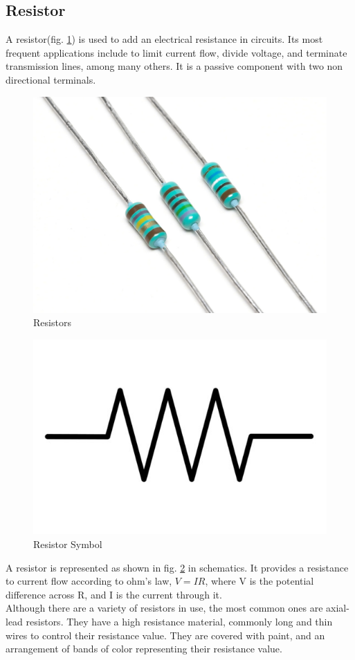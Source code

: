\documentclass{article}
\begin{document}
\subsection{Resistor}
A resistor(fig. \ref{fig:resistors}) is used to add an electrical resistance in circuits. Its most frequent applications include to limit current flow, divide voltage, and terminate transmission lines, among many others. It is a passive component with two non directional terminals. \\
\begin{figure}[h]
	\centering
	\includegraphics[width=0.5\linewidth]{3_Resistors}
	\caption[Resistors]{Resistors}
	\label{fig:resistors}
\end{figure}
\begin{figure}[h]
	\centering
	\includegraphics[width=0.1\linewidth]{resistor_symbol}
	\caption[Resistor Symbol]{Resistor Symbol}
	\label{fig:resistor_symbol}
\end{figure}
A resistor is represented as shown in fig. \ref{fig:resistor_symbol} in schematics. It provides a resistance to current flow according to ohm's law, $ V = IR $, where V is the potential difference across R, and I is the current through it. \\
Although there are a variety of resistors in use, the most common ones are axial-lead resistors. They have a high resistance material, commonly long and thin wires to control their resistance value. They are covered with paint, and an arrangement of bands of color representing their resistance value.
\end{document}
